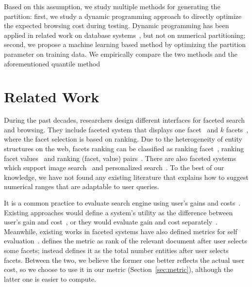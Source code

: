 {Based on this assumption, we study multiple methods for generating the partition: first, we study a dynamic programming approach to directly optimize the expected browsing cost during testing. Dynamic programming has been applied in related work on database systems~\cite{conf/vldb/JagadishKMPSS98}, but not on numerical partitioning; second, we propose a machine learning based method by optimizing the partition parameter on training data. We empirically compare the two methods and the aforementioned quantile method }

\section{Related Work}
\label{sec:relwork}

During the past decades, researchers design different interfaces for faceted search and browsing. They include faceted system that displays one facet~\cite{Roy08} and $k$ facets~\cite{Liberman:2012:AOF:2245276.2245409,Vandic:2013:FSA:2505515.2505664}, where the facet selection is based on ranking. Due to the heterogeneity of entity structures on the web, facets ranking can be classified as ranking facet~\cite{BasuRoy:2008:MDD:1458082.1458088}, ranking facet values~\cite{journals/ijon/KangYZTHC15} and ranking (facet, value) pairs~\cite{kashyap10}. There are also faceted systems which support image search~\cite{Zwol} and personalized search~\cite{Koren:2008:PIF:1367497.1367562}. To the best of our knowledge, we have not found any existing literature that explains how to suggest numerical ranges that are adaptable to user queries. 

It is a common practice to evaluate search engine using user's gains and costs~\cite{järvelin2002cumulated,journals/tois/MoffatZ08,conf/sigir/Azzopardi14,conf/cikm/YilmazVCRB14}. Existing approaches would define a system's utility as the difference between user's gain and cost~\cite{card:1999,journals/tois/MoffatZ08}, or they would evaluate gain and cost separately~\cite{conf/sigir/Azzopardi14,conf/cikm/YilmazVCRB14}. Meanwhile, existing works in faceted systems have also defined metrics for self evaluation~\cite{Liberman:2012:AOF:2245276.2245409,kashyap10,BasuRoy:2008:MDD:1458082.1458088}. \cite{Liberman:2012:AOF:2245276.2245409} defines the metric as rank of the relevant document after user selects some facets; \cite{kashyap10} instead defines it as the total number entities after user selects facets. Between the two, we believe the former one better reflects the actual user cost, so we choose to use it in our metric (Section~\ref{sec:metric}), although the latter one is easier to compute. 

